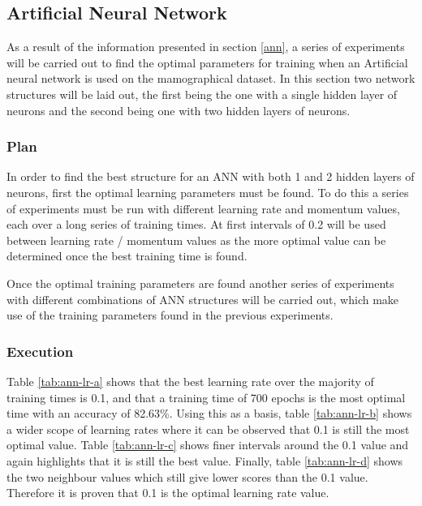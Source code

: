 \documentclass[12pt]{article}
\begin{document}
  \subsection{Artificial Neural Network}
    As a result of the information presented in section \ref{ann}, a series of experiments will be carried out to find the optimal parameters for training when an Artificial neural network is used on the mamographical dataset. In this section two network structures will be laid out, the first being the one with a single hidden layer of neurons and the second being one with two hidden layers of neurons.

    \subsubsection{Plan}
      In order to find the best structure for an ANN with both 1 and 2 hidden layers of neurons, first the optimal learning parameters must be found. To do this a series of experiments must be run with different learning rate and momentum values, each over a long series of training times. At first intervals of 0.2 will be used between learning rate / momentum values as the more optimal value can be determined once the best training time is found.

      Once the optimal training parameters are found another series of experiments with different combinations of ANN structures will be carried out, which make use of the training parameters found in the previous experiments.

    \subsubsection{Execution} \label{ann-ex}
      Table \ref{tab:ann-lr-a} shows that the best learning rate over the majority of training times is 0.1, and that a training time of 700 epochs is the most optimal time with an accuracy of 82.63\%. Using this as a basis, table \ref{tab:ann-lr-b} shows a wider scope of learning rates where it can be observed that 0.1 is still the most optimal value. Table \ref{tab:ann-lr-c} shows finer intervals around the 0.1 value and again highlights that it is still the best value. Finally, table \ref{tab:ann-lr-d} shows the two neighbour values which still give lower scores than the 0.1 value. Therefore it is proven that 0.1 is the optimal learning rate value.
\end{document}
